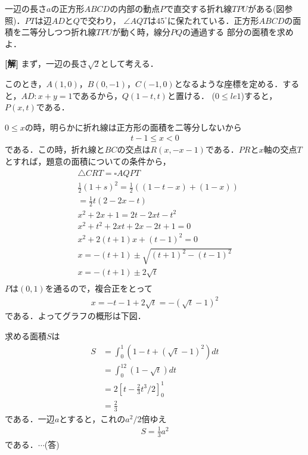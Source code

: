 \documentclass[a4j]{jarticle}
\begin{document}

     \begin{oframed}
     一辺の長さ$a$の正方形$ABCD$の内部の動点$P$で直交する折れ線$TPU$がある(図参照)．$PT$は辺$AD$と$Q$で交わり，
     $\angle AQT$は$45^\circ$に保たれている．正方形$ABCD$の面積を二等分しつつ折れ線$TPU$が動く時，線分$PQ$の通過する
     部分の面積を求めよ．
          \begin{center}
          \scalebox{.7}{}
          \end{center}
     \end{oframed}
\setlength{\columnseprule}{0.4pt}
\begin{multicols}{2}
{\bf[解]} まず，一辺の長さ$\sqrt{2}$として考える．\label{1}

このとき，$A(1,0)$，$B(0,-1)$，$C(-1,0)$となるような座標を定める．すると，$AD:x+y=1$であるから，$Q(1-t,t)$と置ける．
($0\le le1$)すると，$P(x,t)$である．
     \begin{center}
     \scalebox{1}{}
     \end{center}
$0\le x$の時，明らかに折れ線は正方形の面積を二等分しないから
     \begin{align}
     t-1\le x<0\label{1}
     \end{align}
である．この時，折れ線と$BC$の交点は$R(x,-x-1)$である．$PR$と$x$軸の交点$T$とすれば，題意の面積についての条件から，
     \begin{align*}
     &\triangle CRT=\square AQPT \\
     &\frac{1}{2}(1+s)^2=\frac{1}{2}\left((1-t-x)+(1-x)\right) \\
     &=\frac{1}{2}t(2-2x-t) \\
     &x^2+2x+1=2t-2xt-t^2 \\
     &x^2+t^2+2xt+2x-2t+1=0 \\
     &x^2+2(t+1)x+(t-1)^2=0 \\
     &x=-(t+1)\pm\sqrt{(t+1)^2-(t-1)^2} \\
     &x=-(t+1)\pm2\sqrt{t} \\
     \end{align*}
$P$は$(0,1)$を通るので，複合正をとって
     \begin{align*}
     x=-t-1+2\sqrt{t}=-(\sqrt{t}-1)^2
     \end{align*}
である．よってグラフの概形は下図．
    \begin{center}
    \scalebox{1}{}
    \end{center}
求める面積$S$は
     \begin{align*}
     S&=\int_0^1(1-t+(\sqrt{t}-1)^2)dt \\
     &=\int_0^12(1-\sqrt{t})dt \\
     &=2\left[t-\frac{2}{3}t^3/2\right]_0^1 \\
     &=\frac{2}{3}
     \end{align*}
である．一辺$a$とすると，これの$a^2/2$倍ゆえ
     \begin{align*}
     S=\frac{1}{3}a^2
     \end{align*}
である．$\cdots$(答)
\newpage
\end{multicols}
\end{document}
